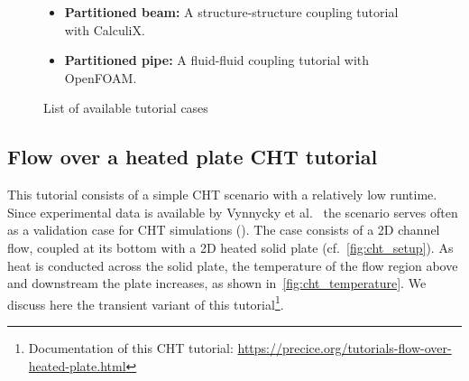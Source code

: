 \begin{figure}[h!]
\begin{framed}
\begin{minipage}{\textwidth}
\begin{minipage}{0.5\textwidth}
\begin{itemize}
      \item \textbf{Partitioned beam:} A structure-structure coupling tutorial with CalculiX.
      \item \textbf{Partitioned pipe:} A fluid-fluid coupling tutorial with OpenFOAM.
    \end{itemize}
  \end{minipage}
\end{minipage}
\end{framed}
\caption{List of available tutorial cases}
\label{fig:tutorials-list}
\end{figure}

\subsection{Flow over a heated plate CHT tutorial}

This tutorial consists of a simple CHT scenario with a relatively low runtime. Since experimental data is available by Vynnycky et al.~\cite{vynnycky1998forced} the scenario serves often as a validation case for CHT simulations (\cite{Birken2010, birken2015fast}). The case consists of a 2D channel flow, coupled at its bottom with a 2D heated solid plate (cf.~\autoref{fig:cht_setup}).
As heat is conducted across the solid plate, the temperature of the flow region above and downstream the plate increases, as shown in~\autoref{fig:cht_temperature}. We discuss here the transient variant of this tutorial\footnote{Documentation of this CHT tutorial: \url{https://precice.org/tutorials-flow-over-heated-plate.html}}. 







